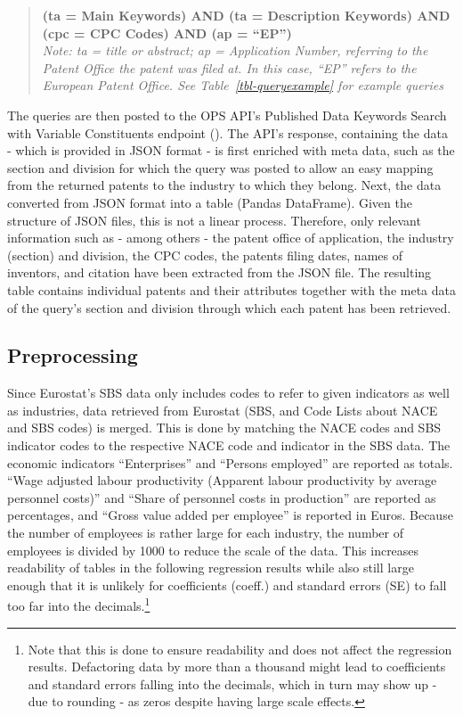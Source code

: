 \documentclass[
  11,
  a4paperpaper,
]{article}
\begin{document}

\begin{quote}
\textbf{(ta = Main Keywords) AND (ta = Description Keywords) AND (cpc =
CPC Codes) AND (ap = ``EP'')}\\
\emph{Note: ta = title or abstract; ap = Application Number, referring
to the Patent Office the patent was filed at. In this case, ``EP''
refers to the European Patent Office. See Table~\ref{tbl-queryexample}
for example queries}
\end{quote}


The queries are then posted to the OPS API's Published Data Keywords
Search with Variable Constituents endpoint
(). The API's response, containing the data - which is
provided in JSON format - is first enriched with meta data, such as the
section and division for which the query was posted to allow an easy
mapping from the returned patents to the industry to which they belong.
Next, the data converted from JSON format into a table (Pandas
DataFrame). Given the structure of JSON files, this is not a linear
process. Therefore, only relevant information such as - among others -
the patent office of application, the industry (section) and division,
the CPC codes, the patents filing dates, names of inventors, and
citation have been extracted from the JSON file. The resulting table
contains individual patents and their attributes together with the meta
data of the query's section and division through which each patent has
been retrieved.

\subsection{Preprocessing}\label{sec-preprocessing}

Since Eurostat's SBS data only includes codes to refer to given
indicators as well as industries, data retrieved from Eurostat (SBS, and
Code Lists about NACE and SBS codes) is merged. This is done by matching
the NACE codes and SBS indicator codes to the respective NACE code and
indicator in the SBS data. The economic indicators ``Enterprises'' and
``Persons employed'' are reported as totals. ``Wage adjusted labour
productivity (Apparent labour productivity by average personnel costs)''
and ``Share of personnel costs in production'' are reported as
percentages, and ``Gross value added per employee'' is reported in
Euros. Because the number of employees is rather large for each
industry, the number of employees is divided by 1000 to reduce the scale
of the data. This increases readability of tables in the following
regression results while also still large enough that it is unlikely for
coefficients (coeff.) and standard errors (SE) to fall too far into the
decimals.\footnote{Note that this is done to ensure readability and does
  not affect the regression results. Defactoring data by more than a
  thousand might lead to coefficients and standard errors falling into
  the decimals, which in turn may show up - due to rounding - as zeros
  despite having large scale effects.\label{note3}}
\end{document}
